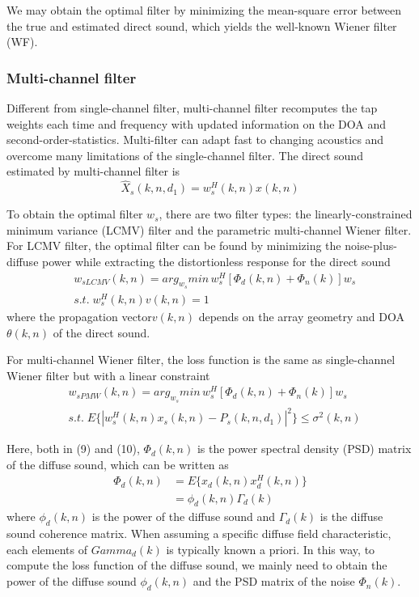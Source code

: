 \documentclass[10pt, a4paper, twocolumn]{article} %
\begin{document}
We may obtain the optimal filter by minimizing the mean-square error between the true and estimated direct sound, which yields the well-known Wiener filter (WF). 

\subsubsection{Multi-channel filter}

Different from single-channel filter, multi-channel filter recomputes the tap weights each time and frequency with updated information on the DOA and second-order-statistics. Multi-filter can adapt fast to changing acoustics and overcome many limitations of the single-channel filter. The direct sound estimated by multi-channel filter is
\begin{equation}
\hat{X}_s(k,n,d_1) = w_s^H(k,n) x(k,n)
\end{equation}

To obtain the optimal filter $w_s$, there are two filter types: the linearly-constrained minimum variance (LCMV) filter and  the parametric multi-channel Wiener filter. For LCMV filter, the optimal filter can be found by minimizing the noise-plus-diffuse power while extracting the distortionless response for the direct sound
\begin{equation}
\begin{split}
&w_{sLCMV}(k,n) = arg_{w_s}min\,{w_s^H}[\Phi_d(k,n)+ \Phi_n(k)]w_s \\
&s.t.\; w_s^H(k,n)v(k,n) = 1
\end{split}
\end{equation}
where the propagation vector$v(k,n)$ depends on the array geometry and DOA $\theta(k,n)$ of the direct sound. 

For multi-channel Wiener filter, the loss function is the same as single-channel Wiener filter but with a linear constraint
\begin{equation}
\begin{split}
& w_{sPMW}(k,n) = arg_{w_s}min\,{w_s^H}[\Phi_d(k,n)+ \Phi_n(k)]w_s \\
& s.t.\;E\{|w_s^H(k,n)x_s(k,n) - P_s(k,n,d_1)|^2\} \leq \sigma^2(k,n)
\end{split}
\end{equation}

Here, both in (9) and (10), $\Phi_d(k,n)$ is the power spectral density (PSD) matrix of the diffuse sound, which can be written as
\begin{equation}
\begin{split}
\Phi_d(k,n) &= E\{x_d(k,n)x_d^H(k,n)\} \\
&= \phi_d(k,n) \Gamma_d(k)
\end{split}
\end{equation}
where $\phi_d(k,n)$ is the power of the diffuse sound and $\Gamma_d(k)$ is the diffuse sound coherence matrix. When assuming a specific diffuse field characteristic, each elements of $Gamma_d(k)$ is typically known a priori. In this way, to compute the loss function of the diffuse sound, we mainly need to obtain the power of the diffuse sound $\phi_d(k,n)$ and the PSD matrix of the noise $\Phi_n(k)$.
\end{document}
